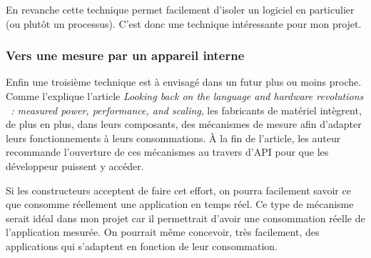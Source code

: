 \documentclass[a4paper, 11pt]{report}
\begin{document}
En revanche cette technique permet facilement d'isoler un logiciel en particulier (ou plutôt un processus). C'est donc une technique intéressante pour mon projet.

			\subsubsection{Vers une mesure par un appareil interne}
Enfin une troisième technique est à envisagé dans un futur plus ou moins proche. Comme l'explique l'article \textit{Looking back on the language and hardware revolutions
~: measured power, performance, and scaling}\cite{Esmaeilzadeh:2011:LBL:1950365.1950402}, les fabricants de matériel intègrent, de plus en plus, dans leurs composants, des mécanismes de mesure afin d'adapter leurs fonctionnements à leurs consommations. À la fin de l'article, les auteur recommande l'ouverture de ces mécanismes au travers d'API pour que les développeur puissent y accéder.

Si les constructeurs acceptent de faire cet effort, on pourra facilement savoir ce que consomme réellement une application en temps réel. Ce type de mécanisme serait idéal dans mon projet car il permettrait d'avoir une consommation réelle de l'application mesurée. On pourrait même concevoir, très facilement, des applications qui s'adaptent en fonction de leur consommation.



		
\end{document}
